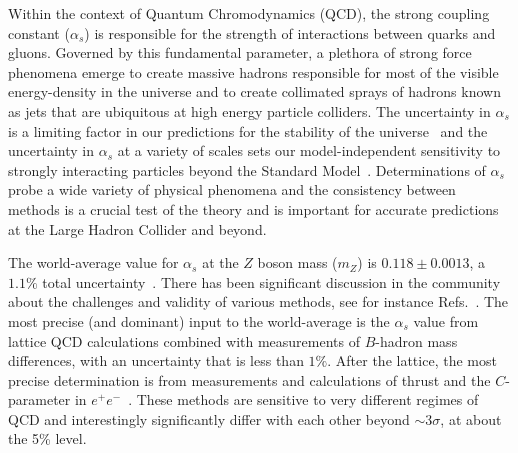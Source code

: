 
Within the context of Quantum Chromodynamics (QCD), the strong coupling constant ($\alpha_s$) is responsible for the strength of interactions between quarks and gluons.  Governed by this fundamental parameter, a plethora of strong force phenomena emerge to create massive hadrons responsible for most of the visible energy-density in the universe and to create collimated sprays of hadrons known as jets that are ubiquitous at high energy particle colliders.  The uncertainty in $\alpha_s$ is a limiting factor in our predictions for the stability of the universe~\cite{Andreassen:2017rzq} and the uncertainty in $\alpha_s$ at a variety of scales sets our model-independent sensitivity to strongly interacting particles beyond the Standard Model~\cite{Kaplan:2008pt,Becciolini:2014lya}.  Determinations of $\alpha_s$ probe a wide variety of physical phenomena and the consistency between methods is a crucial test of the theory and is important for accurate predictions at the Large Hadron Collider and beyond.  

The world-average value for $\alpha_s$ at the $Z$ boson mass ($m_Z$) is $0.118\pm 0.0013$, a $1.1\%$ total uncertainty~\cite{Olive:2016xmw}.  There has been significant discussion in the community about the challenges and validity of various methods, see for instance Refs.~\cite{Bethke:2011tr,Pich:2013sqa,Moch:2014tta,dEnterria:2015kmd,Olive:2016xmw,Salam:2017qdl,Altarelli:2013bpa}.  The most precise (and dominant) input to the world-average is the $\alpha_s$ value from lattice QCD calculations combined with measurements of $B$-hadron mass differences, with an uncertainty that is less than $1\%$.   After the lattice, the most precise determination is from measurements and calculations of thrust and the $C$-parameter in $e^+e^-$~\cite{Abbate:2010xh,Hoang:2015hka,Heister:2003aj,Abdallah:2004xe,Abreu:1996mk,Abreu:1999rc,Biebel:1999zt,Adeva:1992gv,Abbiendi:2004qz,Abe:1994mf}.   These methods are sensitive to very different regimes of QCD and interestingly significantly differ with each other beyond $\sim 3\sigma$, at about the 5\% level.  




